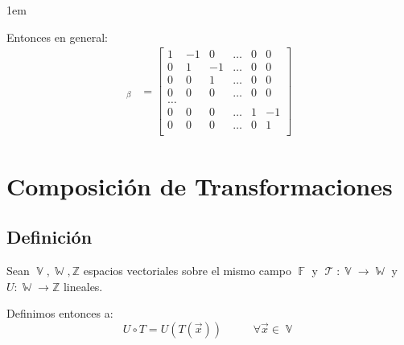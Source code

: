 \documentclass[12pt, fleqn]{report}                             %
\newenvironment{SmallIndentation}[1][0.75em]                    %
        {\begin{adjustwidth}{#1}{}\begin{footnotesize}}             %
        {\end{footnotesize}\end{adjustwidth}}                       %
\DeclareMathOperator \MegaSpace {\quad \quad}                   %
\theoremstyle{break}                                            %
\DeclareMathOperator \GenericField {\mathbb{F}}                 %
\DeclareMathOperator \VectorSet    {\mathbb{V}}                 %
\DeclareMathOperator \SubVectorSet {\mathbb{W}}                 %
\DeclareMathOperator \LinTrans      {\mathcal{T}}               %
\newcommand{\bVector}[1]                                        %
        { \ensuremath{\begin{bmatrix}#1\end{bmatrix}} }             %
\begin{document}
\begin{SmallIndentation}[1em]
                        Entonces en general:
                        \begin{align*}
                            [T]_\beta
                                &= \bVector{
                                    1 & -1 &  0 & \dots & 0 & 0   \\
                                    0 &  1 & -1 & \dots & 0 & 0   \\
                                    0 &  0 &  1 & \dots & 0 & 0   \\
                                    0 &  0 &  0 & \dots & 0 & 0   \\
                                    \dots                         \\
                                    0 &  0 &  0 & \dots & 1 & -1  \\
                                    0 &  0 &  0 & \dots & 0 & 1   \\
                                }
                        \end{align*}
                    
                    \end{SmallIndentation}
                        
            
            
        \clearpage
        \section{Composición de Transformaciones}

            \subsection{Definición}

                Sean $\VectorSet, \SubVectorSet, \mathbb{Z}$ espacios vectoriales sobre el mismo campo
                $\GenericField$ y $\LinTrans: \VectorSet \to \SubVectorSet$ y $U: \SubVectorSet \to \mathbb{Z}$
                lineales.

                Definimos entonces a:
                \begin{equation*}
                    U \circ T
                        = U(T(\vec x)) \MegaSpace \forall \vec x \in \VectorSet
                \end{equation*}
\end{document}
